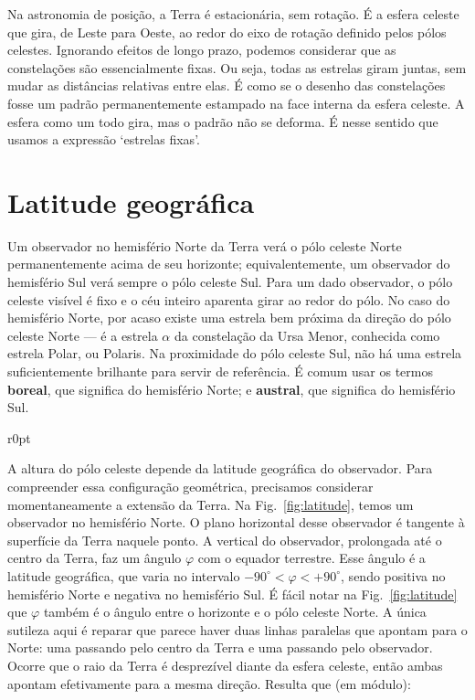 Na astronomia de posição, a Terra é estacionária, sem rotação. É a esfera celeste que gira, de Leste para Oeste, ao redor do eixo de rotação definido pelos pólos celestes. Ignorando efeitos de longo prazo, podemos considerar que as constelações são essencialmente fixas. Ou seja, todas as estrelas giram juntas, sem mudar as distâncias relativas entre elas. É como se o desenho das constelações fosse um padrão permanentemente estampado na face interna da esfera celeste. A esfera como um todo gira, mas o padrão não se deforma. É nesse sentido que usamos a expressão `estrelas fixas'. 

\section{Latitude geográfica}

Um observador no hemisfério Norte da Terra verá o pólo celeste Norte permanentemente acima de seu horizonte; equivalentemente, um observador do hemisfério Sul verá sempre o pólo celeste Sul. Para um dado observador, o pólo celeste visível é fixo e o céu inteiro aparenta girar ao redor do pólo. No caso do hemisfério Norte, por acaso existe uma estrela bem próxima da direção do pólo celeste Norte --- é a estrela $\alpha$ da constelação da Ursa Menor, conhecida como estrela Polar, ou Polaris. Na proximidade do pólo celeste Sul, não há uma estrela suficientemente brilhante para servir de referência. É comum usar os termos \textbf{boreal}, que significa do hemisfério Norte; e \textbf{austral}, que significa do hemisfério Sul.

\newpage

\begin{wrapfigure}{r}{0pt}

\caption{Latitude geográfica.}
\label{fig:latitude}
\end{wrapfigure}

A altura do pólo celeste depende da latitude geográfica do observador. Para compreender essa configuração geométrica, precisamos considerar momentaneamente a extensão da Terra. Na Fig.~\ref{fig:latitude}, temos um observador no hemisfério Norte. O plano horizontal desse observador é tangente à superfície da Terra naquele ponto. A vertical do observador, prolongada até o centro da Terra, faz um ângulo $\varphi$ com o equador terrestre. Esse ângulo é a latitude geográfica, que varia no intervalo $-90^{\circ} < \varphi < +90^{\circ}$, sendo positiva no hemisfério Norte e negativa no hemisfério Sul. É fácil notar na Fig.~\ref{fig:latitude} que $\varphi$ também é o ângulo entre o horizonte e o pólo celeste Norte. A única sutileza aqui é reparar que parece haver duas linhas paralelas que apontam para o Norte: uma passando pelo centro da Terra e uma passando pelo observador. Ocorre que o raio da Terra é desprezível diante da esfera celeste, então ambas apontam efetivamente para a mesma direção. Resulta que (em módulo):

